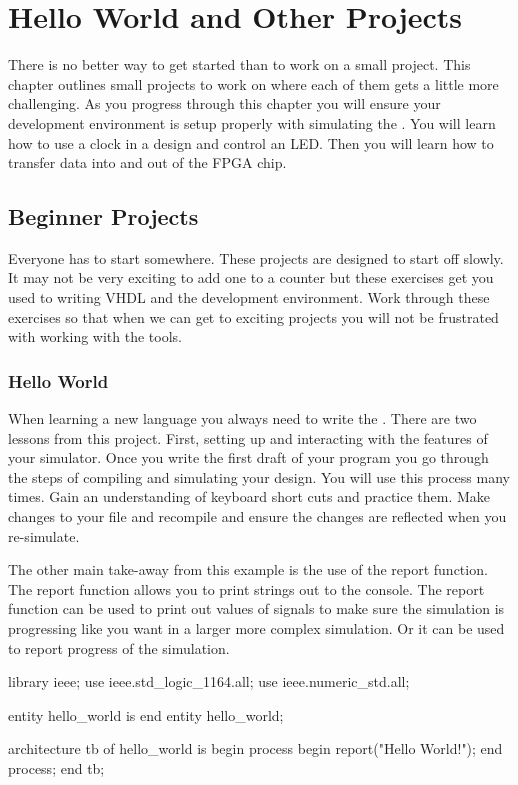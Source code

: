\chapter{Hello World and Other Projects}

There is no better way to get started than to work on a small project. This chapter outlines small projects to work on where each of them gets a little more challenging. As you progress through this chapter you will ensure your development environment is setup properly with simulating the . You will learn how to use a clock in a design and control an \ac{LED}. Then you will learn how to transfer data into and out of the \ac{FPGA} chip. 
	
\section{Beginner Projects}

Everyone has to start somewhere. These projects are designed to start off slowly. It may not be very exciting to add one to a counter but these exercises get you used to writing \ac{VHDL} and the development environment. Work through these exercises so that when we can get to exciting projects you will not be frustrated with working with the tools. 
	
\subsection{Hello World}

When learning a new language you always need to write the . There are two lessons from this project. First, setting up and interacting with the features of your simulator. Once you write the first draft of your program you go through the steps of compiling and simulating your design. You will use this process many times. Gain an understanding of keyboard short cuts and practice them. Make changes to your file and recompile and ensure the changes are reflected when you re-simulate.

The other main take-away from this example is the use of the report function. The report function allows you to print strings out to the console. The report function can be used to print out values of signals to make sure the simulation is progressing like you want in a larger more complex simulation. Or it can be used to report progress of the simulation.      

\begin{VHDLlisting}[tabsize=4]
library ieee;
  use ieee.std_logic_1164.all;
  use ieee.numeric_std.all;
  
entity hello_world is
end entity hello_world;

architecture tb of hello_world is
begin
    process
    begin
        report("Hello World!");
    end process;
end tb;
\end{VHDLlisting}
	
